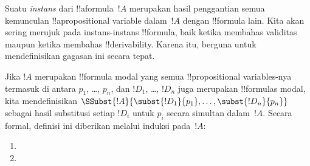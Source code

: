 \documentclass[../../../include/open-logic-section]{subfiles}
\begin{document}


Suatu \emph{instans} dari !!a{formula}~$!A$ merupakan hasil penggantian semua
kemunculan !!a{propositional variable} dalam~$!A$ dengan !!{formula} lain.
Kita akan sering merujuk pada instans-instans !!{formula}, baik ketika
membahas validitas maupun ketika membahas !!{derivability}. Karena itu,
berguna untuk mendefinisikan gagasan ini secara tepat.

\begin{defn}
  Jika $!A$ merupakan !!{formula} modal yang semua !!{propositional
    variable}s-nya termasuk di antara $p_1$, \dots, $p_n$, dan $!D_1$,
  \dots, $!D_n$ juga merupakan !!{formula}s modal, kita mendefinisikan
  $\SSubst{!A}{\subst{!D_1}{p_1}, \dots, \subst{!D_n}{p_n}}$ sebagai hasil
  substitusi setiap $!D_i$ untuk $p_i$ secara simultan dalam~$!A$. Secara
  formal, definisi ini diberikan melalui induksi pada~$!A$:
  \begin{enumerate}
    \item {}
    \item {}
\end{enumerate}
\end{defn}
\end{document}
